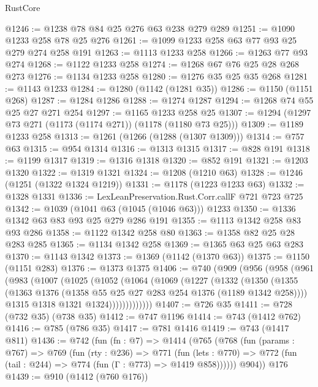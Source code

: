 \begin{lexlean}{RustCore}
\begin{coremodule}
@1246 := @1238 @78 @84 @25 @276 @63 @238 @279 @289
@1251 := @1090 @1233 @258 @78 @25 @276
@1261 := @1099 @1233 @258 @63 @77 @93 @25 @279 @274 @258 @191
@1263 := @1113 @1233 @258
@1266 := @1263 @77 @93 @274
@1268 := @1122 @1233 @258
@1274 := @1268 @67 @76 @25 @28 @268 @273
@1276 := @1134 @1233 @258
@1280 := @1276 @35 @25 @35 @268
@1281 := @1143 @1233
@1284 := @1280 (@1142 (@1281 @35))
@1286 := @1150 (@1151 @268)
@1287 := @1284 @1286
@1288 := @1274 @1287
@1294 := @1268 @74 @55 @25 @27 @271 @254
@1297 := @1165 @1233 @258 @25
@1307 := @1294 (@1297 @73 @271 (@1173 (@1174 @271)) (@1178 (@1180 @73 @25)))
@1309 := @1189 @1233 @258
@1313 := @1261 (@1266 (@1288 (@1307 @1309)))
@1314 := @757 @63
@1315 := @954 @1314
@1316 := @1313 @1315
@1317 := @828 @191
@1318 := @1199 @1317
@1319 := @1316 @1318
@1320 := @852 @191
@1321 := @1203 @1320
@1322 := @1319 @1321
@1324 := @1208 (@1210 @63)
@1328 := @1246 (@1251 (@1322 @1324 @1219))
@1331 := @1178 (@1223 @1233 @63)
@1332 := @1328 @1331
@1336 := LexLeanPreservation.Rust.Corr.callF @721 @723 @725
@1342 := @1039 (@1041 @63 (@1045 (@1046 @63))) @1233
@1350 := @1336 @1342 @63 @83 @93 @25 @279 @286 @191
@1355 := @1113 @1342 @258 @83 @93 @286
@1358 := @1122 @1342 @258 @80
@1363 := @1358 @82 @25 @28 @283 @285
@1365 := @1134 @1342 @258
@1369 := @1365 @63 @25 @63 @283
@1370 := @1143 @1342
@1373 := @1369 (@1142 (@1370 @63))
@1375 := @1150 (@1151 @283)
@1376 := @1373 @1375
@1406 := @740
    (@909
      (@956
        (@958
          (@961
            (@983
              (@1007
                (@1025
                  (@1052
                    (@1064
                      (@1069
                        (@1227
                          (@1332
                            (@1350
                              (@1355
                                (@1363
                                  @1376
                                  (@1358 @55 @25 @27 @283 @254 @1376 (@1189 @1342 @258))))
                              @1315
                              @1318
                              @1321
                              @1324)))))))))))))
@1407 := @726 @35
@1411 := @728 (@732 @35) (@738 @35)
@1412 := @747 @1196
@1414 := @743 (@1412 @762)
@1416 := @785 (@786 @35)
@1417 := @781 @1416
@1419 := @743 (@1417 @811)
@1436 := @742
    (fun (fn : @7) =>
    @1414
      (@765
        (@768
          (fun (params : @767) =>
          @769
            (fun (rty : @236) =>
            @771
              (fun (lets : @770) =>
              @772 (fun (tail : @244) => @774 (fun (Γ : @773) => @1419 @858))))))
        @904))
    @176
@1439 := @910 (@1412 (@760 @176))

\end{coremodule}
\end{lexlean}
